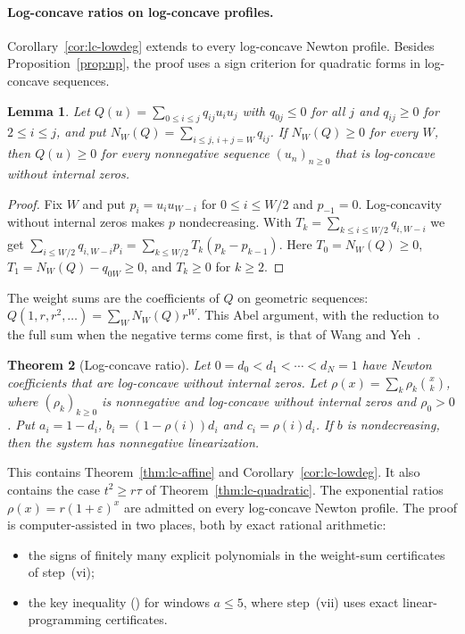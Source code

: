 \documentclass[twoside,10pt]{article}
\numberwithin{equation}{section}
\theoremstyle{slbody}
\newtheorem{theorem}{Theorem}[section]
\newtheorem{lemma}[theorem]{Lemma}
\theoremstyle{definition}
\theoremstyle{remark}
\renewcommand{\eqref}[1]{\textup{{\normalfont(\oldstylenums{\ref{#1}}}\normalfont)}}
\begin{document}
\paragraph{Log-concave ratios on log-concave profiles.}
Corollary~\ref{cor:lc-lowdeg} extends to every log-concave Newton profile. Besides Proposition~\ref{prop:np}, the proof uses a sign criterion for quadratic forms in log-concave sequences.

\begin{lemma}\label{lem:abel-weights}
Let $Q(u)=\sum_{0\leq i\leq j}q_{ij}u_iu_j$ with $q_{0j}\leq0$ for all $j$ and $q_{ij}\geq0$ for $2\leq i\leq j$, and put $N_W(Q)=\sum_{i\leq j,\,i+j=W}q_{ij}$. If $N_W(Q)\geq0$ for every $W$, then $Q(u)\geq0$ for every nonnegative sequence $(u_n)_{n\geq0}$ that is log-concave without internal zeros.
\end{lemma}

\begin{proof}
Fix $W$ and put $p_i=u_iu_{W-i}$ for $0\leq i\leq W/2$ and $p_{-1}=0$. Log-concavity without internal zeros makes $p$ nondecreasing. With $T_k=\sum_{k\leq i\leq W/2}q_{i,W-i}$ we get $\sum_{i\leq W/2}q_{i,W-i}p_i=\sum_{k\leq W/2}T_k(p_k-p_{k-1})$. Here $T_0=N_W(Q)\geq0$, $T_1=N_W(Q)-q_{0W}\geq0$, and $T_k\geq0$ for $k\geq2$.
\end{proof}

The weight sums are the coefficients of $Q$ on geometric sequences: $Q(1,r,r^2,\ldots)=\sum_WN_W(Q)r^W$. This Abel argument, with the reduction to the full sum when the negative terms come first, is that of Wang and Yeh~\cite[Lemma~2.1 and Corollary~2.6]{wangyeh}.

\begin{theorem}[Log-concave ratio]\label{thm:lc-general}
Let $0=d_0<d_1<\cdots<d_N=1$ have Newton coefficients that are log-concave without internal zeros. Let $\rho(x)=\sum_k\rho_k\binom xk$, where $(\rho_k)_{k\geq0}$ is nonnegative and log-concave without internal zeros and $\rho_0>0$. Put $a_i=1-d_i$, $b_i=(1-\rho(i))d_i$ and $c_i=\rho(i)d_i$. If $b$ is nondecreasing, then the system has nonnegative linearization.
\end{theorem}

This contains Theorem~\ref{thm:lc-affine} and Corollary~\ref{cor:lc-lowdeg}. It also contains the case $t^2\geq r\tau$ of Theorem~\ref{thm:lc-quadratic}. The exponential ratios $\rho(x)=r(1+\varepsilon)^x$ are admitted on every log-concave Newton profile. The proof is computer-assisted in two places, both by exact rational arithmetic:
\begin{itemize}
\item the signs of finitely many explicit polynomials in the weight-sum certificates of step~(vi);
\item the key inequality \eqref{eq:G-key} for windows $a\leq5$, where step~(vii) uses exact linear-programming certificates.
\end{itemize}
\end{document}

